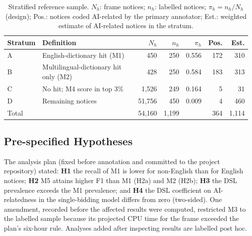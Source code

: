 \begin{table}[t]
\caption{Stratified reference sample. $N_h$: frame notices; $n_h$: labelled notices; $\pi_h=n_h/N_h$ (design); Pos.: notices coded AI-related by the primary annotator; Est.: weighted estimate of AI-related notices in the stratum.}\label{tab:design}
\centering
\begin{tabular}{llrrrrr}
\toprule
Stratum & Definition & $N_h$ & $n_h$ & $\pi_h$ & Pos. & Est. \\
\midrule
A & English-dictionary hit (M1) & 450 & 250 & 0.556 & 172 & 310 \\
B & Multilingual-dictionary hit only (M2) & 428 & 250 & 0.584 & 183 & 313 \\
C & No hit; M4 score in top 3\% & 1,526 & 249 & 0.164 & 5 & 31 \\
D & Remaining notices & 51,756 & 450 & 0.009 & 4 & 460 \\
\midrule
Total & & 54,160 & 1,199 & & 364 & 1,114 \\
\bottomrule
\end{tabular}
\end{table}

\subsection{Pre-specified Hypotheses}
The analysis plan (fixed before annotation and committed to the project repository) stated: \textbf{H1} the recall of M1 is lower for non-English than for English notices; \textbf{H2} M5 attains higher F1 than M1 (H2a) and M2 (H2b); \textbf{H3} the DSL prevalence exceeds the M1 prevalence; and \textbf{H4} the DSL coefficient on AI-relatedness in the single-bidding model differs from zero (two-sided). One amendment, recorded before the affected results were computed, restricted M3 to the labelled sample because its projected CPU time for the frame exceeded the plan's six-hour rule. Analyses added after inspecting results are labelled post hoc.
